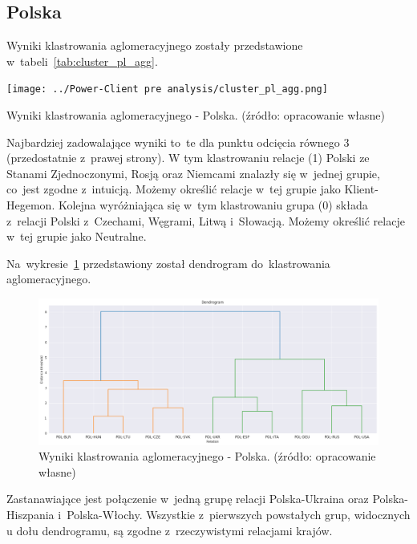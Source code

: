 \documentclass[11pt]{report}
\begin{document}
    \subsection{Polska}
    Wyniki klastrowania aglomeracyjnego zostały przedstawione w~tabeli~\ref{tab:cluster_pl_agg}.

    \begin{table}[tp]
        \centering
        \texttt{[image: ../Power-Client pre analysis/cluster\_pl\_agg.png]}
        \caption{Wyniki klastrowania aglomeracyjnego - Polska. (źródło: opracowanie własne)}
        \label{tab:cluster_pl_agg}
    \end{table}

    Najbardziej zadowalające wyniki to~te dla punktu odcięcia równego 3 (przedostatnie z~prawej strony).
    W tym klastrowaniu relacje (1) Polski ze Stanami Zjednoczonymi, Rosją oraz Niemcami znalazły się w~jednej grupie,
    co~jest zgodne z~intuicją.
    Możemy określić relacje w~tej grupie jako Klient-Hegemon.
    Kolejna wyróżniająca się w~tym klastrowaniu grupa (0) składa z~relacji Polski z~Czechami, Węgrami, Litwą i~Słowacją.
    Możemy określić relacje w~tej grupie jako Neutralne.

    Na~wykresie~\ref{fig:cluster_pl_agg_dendrogram} przedstawiony został dendrogram do~klastrowania aglomeracyjnego.

    \begin{figure}[tp]
        \centering
        \includegraphics[width=\linewidth]{../Power-Client pre analysis/cluster_pl_agg_dendrogram.png}
        \caption{Wyniki klastrowania aglomeracyjnego - Polska. (źródło: opracowanie własne)}
        \label{fig:cluster_pl_agg_dendrogram}
    \end{figure}

    Zastanawiające jest połączenie w~jedną grupę relacji Polska-Ukraina oraz Polska-Hiszpania i~Polska-Włochy.
    Wszystkie z~pierwszych powstałych grup, widocznych u dołu dendrogramu, są zgodne z~rzeczywistymi relacjami krajów.
\end{document}
